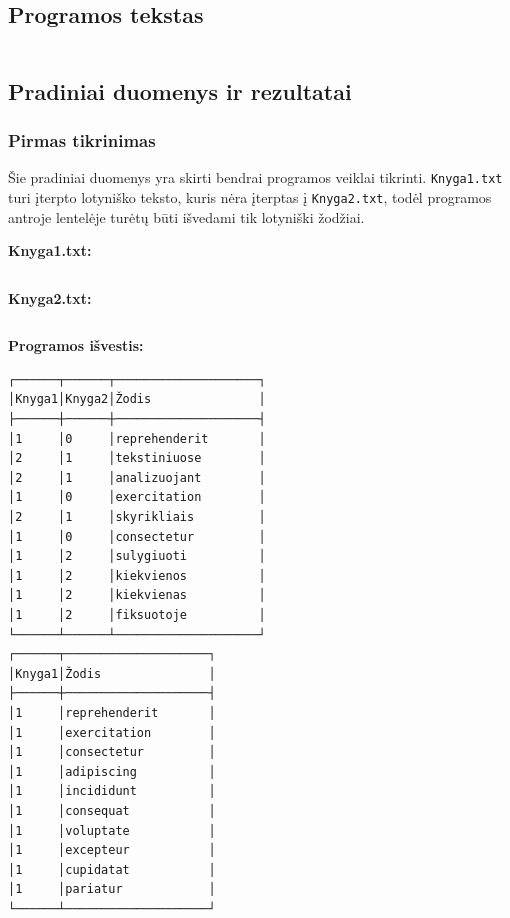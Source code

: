 \documentclass{article}
\begin{document}
\subsection{Programos tekstas}

\inputminted{csharp}{Assets/L4/L4-rawtext.txt}

\subsection{Pradiniai duomenys ir rezultatai}

\subsubsection{Pirmas tikrinimas}

Šie pradiniai duomenys yra skirti bendrai programos veiklai tikrinti. \texttt{Knyga1.txt} turi įterpto lotyniško teksto,
kuris nėra įterptas į \texttt{Knyga2.txt}, todėl programos antroje lentelėje turėtų būti išvedami tik lotyniški žodžiai.

\begin{changemargin}{0cm}{0cm}
    \textbf{Knyga1.txt:}
\end{changemargin}

\inputminted{text}{Assets/L4/t1-k1.txt}

\vspace{0.5cm}

\begin{changemargin}{0cm}{0cm}
    \textbf{Knyga2.txt:}
\end{changemargin}


\inputminted{text}{Assets/L4/t1-k2.txt}

\begin{changemargin}{0cm}{0cm}
    \textbf{Programos išvestis:}
\end{changemargin}

\begin{verbatim}
┌──────┬──────┬────────────────────┐
│Knyga1│Knyga2│Žodis               │
├──────┼──────┼────────────────────┤
│1     │0     │reprehenderit       │
│2     │1     │tekstiniuose        │
│2     │1     │analizuojant        │
│1     │0     │exercitation        │
│2     │1     │skyrikliais         │
│1     │0     │consectetur         │
│1     │2     │sulygiuoti          │
│1     │2     │kiekvienos          │
│1     │2     │kiekvienas          │
│1     │2     │fiksuotoje          │
└──────┴──────┴────────────────────┘
┌──────┬────────────────────┐
│Knyga1│Žodis               │
├──────┼────────────────────┤
│1     │reprehenderit       │
│1     │exercitation        │
│1     │consectetur         │
│1     │adipiscing          │
│1     │incididunt          │
│1     │consequat           │
│1     │voluptate           │
│1     │excepteur           │
│1     │cupidatat           │
│1     │pariatur            │
└──────┴────────────────────┘
    
\end{verbatim}
\end{document}
